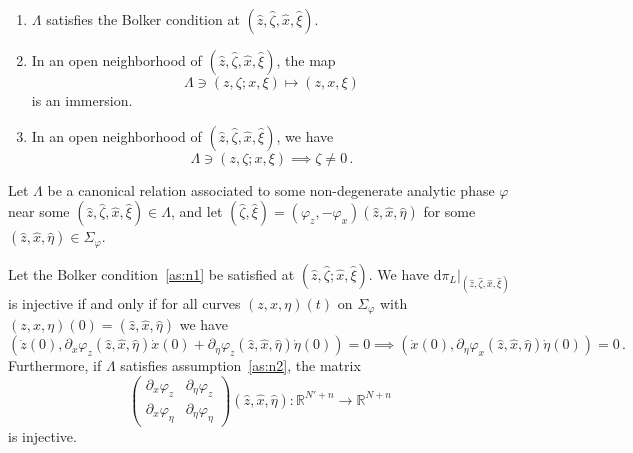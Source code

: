 \documentclass[10pt,a4paper]{amsart}
\newcommand{\RR}{\mathbb{R}}
\newcommand{\dd}{\mathrm{d}}
\newcommand{\del}{\partial}
\begin{document}
	\begin{enumerate}[label=$\mathrm{ph}$\arabic*.]%
		\item\label{as:n1} $\Lambda$ satisfies the Bolker condition at $(\hat z, \hat\zeta,\hat x, \hat \xi)$.
		\item\label{as:n2} In an open neighborhood of $(\hat z,\hat \zeta, \hat x, \hat \xi)$, the map 
				\[
					\Lambda \ni (z,\zeta; x,\xi)\mapsto (z,x,\xi)
				\]
				is an immersion.
		\item\label{as:n3} In an open neighborhood of $(\hat z,\hat \zeta, \hat x, \hat \xi)$, we have
			\[
				\Lambda \ni (z,\zeta ;x,\xi) \implies \zeta \neq 0\,.
			\]
	\end{enumerate}

\begin{lemma}
	Let $\Lambda$ be a canonical relation associated to some non-degenerate analytic phase $\varphi$ near some $(\hat z, \hat \zeta, \hat x, \hat \xi) \in \Lambda$, and let $(\hat \zeta,\hat \xi) = (\varphi_z,-\varphi_x)(\hat z, \hat x, \hat \eta)$ for some $(\hat z, \hat x, \hat \eta) \in \Sigma_\varphi$.

	Let the Bolker condition~\ref{as:n1} be satisfied at $(\hat z,\hat \zeta;\hat x,\hat\xi)$. We have $\dd\pi_L\vert_{(\hat z, \hat \zeta, \hat x, \hat \xi)}$ is injective if and only if for all curves $(z,x,\eta)(t)$ on $\Sigma_\varphi$ with $(z,x,\eta)(0) = (\hat z, \hat x, \hat \eta)$ we have
\begin{equation}\label{eq:injmatrix}
(\dot z(0), \del_x\varphi_{z}(\hat z, \hat x, \hat \eta)\dot x(0) +  \del_\eta\varphi_{z}(\hat z, \hat x, \hat \eta)\dot\eta(0)) = 0 \implies (\dot x(0), \del_\eta\varphi_{x}(\hat z, \hat x, \hat \eta)\dot\eta(0)) = 0\,.
\end{equation}
Furthermore, if $\Lambda$ satisfies assumption~\ref{as:n2}, 
	the matrix
	\begin{equation}\label{eq:fullyinvmat}
		\begin{pmatrix}
			\del_x\varphi_z & \del_\eta\varphi_z \\
			\del_x\varphi_\eta & \del_\eta\varphi_\eta
		\end{pmatrix}(\hat z,\hat x,\hat\eta) \colon \RR^{N'+n} \to \RR^{N+n}
	\end{equation}
	is injective.
\end{lemma}
\end{document}
